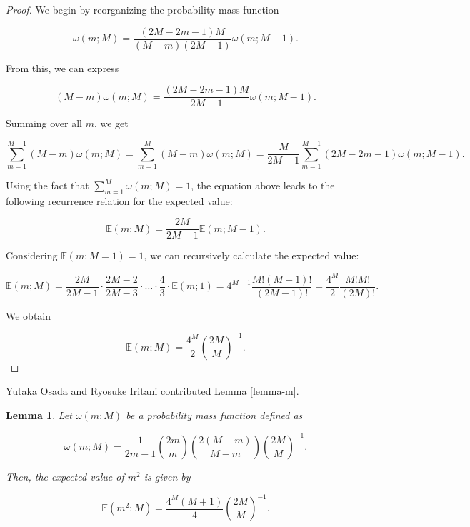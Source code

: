 \documentclass[11pt, class=article, crop=false]{standalone}
\newtheorem{lemma}{Lemma}[subsection]
\theoremstyle{definition}
\begin{document}
\begin{proof}
We begin by reorganizing the probability mass function

\begin{equation}
    \omega(m; M) = \frac{(2M - 2m - 1) M}{(M - m)(2M - 1)} \omega(m; M - 1).
\end{equation}

From this, we can express

\begin{equation}
    (M - m) \omega(m; M) = \frac{(2M - 2m - 1) M}{2M - 1} \omega(m; M - 1).
\end{equation}

Summing over all $m$, we get

\begin{equation}
    \sum_{m = 1}^{M - 1} (M - m) \omega(m; M)
    = \sum_{m = 1}^{M} (M - m) \omega(m; M)
    = \frac{M}{2M - 1} \sum_{m = 1}^{M - 1} (2M - 2m - 1) \omega(m; M - 1).
\end{equation}

Using the fact that $\sum_{m = 1}^{M} \omega(m; M) = 1$, the equation above leads to the following recurrence relation for the expected value:

\begin{equation}
    \mathbb{E}(m; M) = \frac{2M}{2M - 1} \mathbb{E}(m; M - 1).
\end{equation}

Considering $\mathbb{E}(m; M = 1) = 1$, we can recursively calculate the expected value:

\begin{equation}
    \mathbb{E}(m; M) = \frac{2M}{2M - 1} \cdot \frac{2M - 2}{2M - 3} \cdot \ldots \cdot \frac{4}{3} \cdot \mathbb{E}(m; 1) = 4^{M - 1} \frac{M!(M - 1)!}{(2M - 1)!} = \frac{4^{M}}{2}\frac{M!M!}{(2M)!}.
\end{equation}

We obtain

\begin{equation}
    \mathbb{E}(m; M) = \frac{4^{M}}{2}\binom{2M}{M}^{-1}.
\end{equation}
\end{proof}

Yutaka Osada and Ryosuke Iritani contributed Lemma \ref{lemma-m}.

\begin{lemma}
\label{lemma-m2}
Let $\omega(m; M)$ be a probability mass function defined as

\begin{equation}
    \omega(m; M) = \frac{1}{2m - 1} \binom{2m}{m} \binom{2(M - m)}{M - m} \binom{2M}{M}^{-1}.
\end{equation}

Then, the expected value of $m^2$ is given by

\begin{equation}
    \mathbb{E}(m^2; M) = \frac{4^M (M + 1)}{4} {\binom{2M}{M}}^{-1}.
\end{equation}
\end{lemma}
\end{document}
